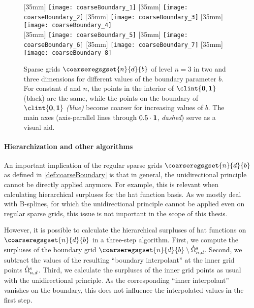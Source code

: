 \begin{figure}
  [35mm]{%
    \texttt{[image: coarseBoundary\_1]}%
  }%
  \hfill%
  [35mm]{%
    \texttt{[image: coarseBoundary\_2]}%
  }%
  \hfill%
  [35mm]{%
    \texttt{[image: coarseBoundary\_3]}%
  }%
  \hfill%
  [35mm]{%
    \texttt{[image: coarseBoundary\_4]}%
  }\\[2mm]%
  [35mm]{%
    \texttt{[image: coarseBoundary\_5]}%
  }%
  \hfill%
  [35mm]{%
    \texttt{[image: coarseBoundary\_6]}%
  }%
  \hfill%
  [35mm]{%
    \texttt{[image: coarseBoundary\_7]}%
  }%
  \hfill%
  [35mm]{%
    \texttt{[image: coarseBoundary\_8]}%
  }%
  \caption[%
    Comparison of regular sparse grids with coarse boundary%
  ]{%
    Sparse grids $\coarseregsgset{n}{d}{b}$ of level $n = 3$
    in two and three dimensions for different values of the
    boundary parameter $b$.
    For constant $d$ and $n$,
    the points in the interior of $\clint{\*0, \*1}$
    (black) are the same,
    while the points on the boundary of $\clint{\*0, \*1}$
    \emph{\textcolor{mittelblau}{(blue)}} become coarser
    for increasing values of $b$.
    The main axes (axis-parallel lines through $0.5 \cdot {\boldsymbol{1}}$, \emph{dashed})
    serve as a visual aid.%
  }%
  \label{fig:coarseBoundary}%
\end{figure}

\paragraph{Hierarchization and other algorithms}

An important implication of the regular sparse grids
$\coarseregsgset{n}{d}{b}$ as defined in \cref{def:coarseBoundary}
is that in general,
the unidirectional principle cannot be directly applied anymore.
For example, this is relevant when calculating hierarchical surpluses
for the hat function basis.
As we mostly deal with B-splines, for which the unidirectional
principle cannot be applied even on regular sparse grids,
this issue is not important in the scope of this thesis.

However, it is possible to calculate the hierarchical surpluses
of hat functions on $\coarseregsgset{n}{d}{b}$ in a three-step algorithm.
First, we compute the surpluses of the boundary grid
$\coarseregsgset{n}{d}{b} \setminus \interiorregsgset{n}{d}$.
Second, we subtract the values of the resulting ``boundary interpolant'' at
the inner grid points
$\interiorregsgset{n}{d}$.
Third, we calculate the surpluses of the inner grid points
as usual with the unidirectional principle.
As the corresponding ``inner interpolant'' vanishes
on the boundary, this does not influence the interpolated values in the
first step.



